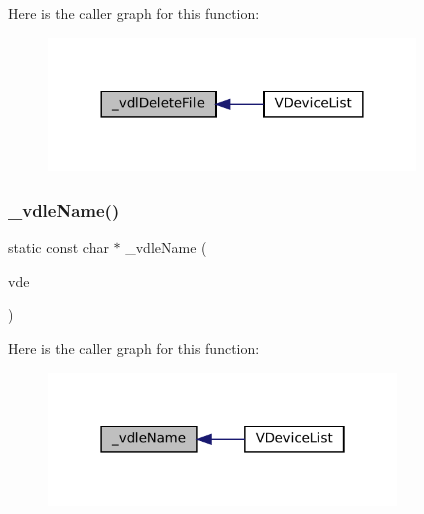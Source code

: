 Here is the caller graph for this function\+:
\nopagebreak
\begin{figure}[H]
\begin{center}
\leavevmode
\includegraphics[width=276pt]{vfs-devlist_8c_a0b475104106edfb663b7e7e34b997acd_icgraph}
\end{center}
\end{figure}
\mbox{\label{vfs-devlist_8c_addf63a1aab1d6a14f8c00f3a4d9e5d6f}} 
\subsubsection{\texorpdfstring{\+\_\+vdle\+Name()}{\_vdleName()}}
{\footnotesize\ttfamily static const char $\ast$ \+\_\+vdle\+Name (\begin{DoxyParamCaption}\item[{struct V\+Dir\+Entry $\ast$}]{vde }\end{DoxyParamCaption})\hspace{0.3cm}{\ttfamily [static]}}

Here is the caller graph for this function\+:
\nopagebreak
\begin{figure}[H]
\begin{center}
\leavevmode
\includegraphics[width=262pt]{vfs-devlist_8c_addf63a1aab1d6a14f8c00f3a4d9e5d6f_icgraph}
\end{center}
\end{figure}
\mbox{\label{vfs-devlist_8c_a243a40bbeeef820785783e97ab9db277}} 
